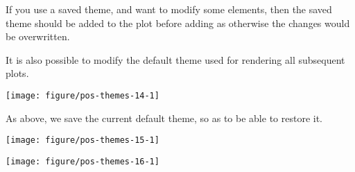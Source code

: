 \documentclass[krantz2]{krantz}\usepackage{knitr}%
\begin{document}
\begin{warningbox}
If you use a saved theme, and want to modify some elements, then the saved theme should be added to the plot before adding  as otherwise the changes would be overwritten.
\end{warningbox}

It is also possible to modify the default theme used for rendering all subsequent plots.

\begin{knitrout}\footnotesize
{}\color{fgcolor}\begin{kframe}
\begin{alltt}
\end{alltt}
\end{kframe}

{\centering \texttt{[image: figure/pos-themes-14-1]} 

}



\end{knitrout}

As above, we save the current default theme, so as to be able to restore it.

\begin{knitrout}\footnotesize
{}\color{fgcolor}\begin{kframe}
\begin{alltt}
 \hlkwb{<-} \hlstd{(} \hlstd{=} \hlstd{(} \hlstd{=} \hlstd{))}
\end{alltt}
\end{kframe}

{\centering \texttt{[image: figure/pos-themes-15-1]} 

}



\end{knitrout}

\begin{knitrout}\footnotesize
{}\color{fgcolor}\begin{kframe}
\begin{alltt}
\end{alltt}
\end{kframe}

{\centering \texttt{[image: figure/pos-themes-16-1]} 

}



\end{knitrout}
\end{document}
